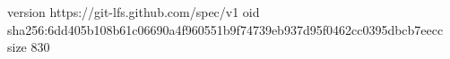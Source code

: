 version https://git-lfs.github.com/spec/v1
oid sha256:6dd405b108b61c06690a4f960551b9f74739eb937d95f0462cc0395dbcb7eecc
size 830
